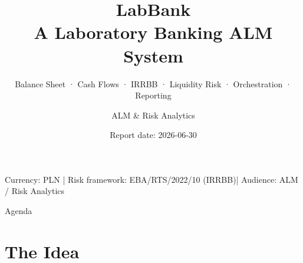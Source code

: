 \documentclass[aspectratio=169,10pt]{beamer}
\title[LabBank — ALM System]{\textbf{LabBank}\\[4pt]
  \large A Laboratory Banking ALM System}
\subtitle{Balance Sheet · Cash Flows · IRRBB · Liquidity Risk · Orchestration · Reporting}
\author{ALM \& Risk Analytics}
\date{Report date: 2026-06-30}
\institute{LabBank Project}
\begin{document}

\begin{frame}[plain]
  \titlepage
  \vspace{-6pt}
  \begin{center}
    \small\textcolor{labgrey}{Currency: PLN \quad|\quad
      Risk framework: EBA/RTS/2022/10 (IRRBB)\quad|\quad
      Audience: ALM / Risk Analytics}
  \end{center}
\end{frame}

\begin{frame}{Agenda}
  \tableofcontents
\end{frame}

\section{The Idea}
\end{document}
